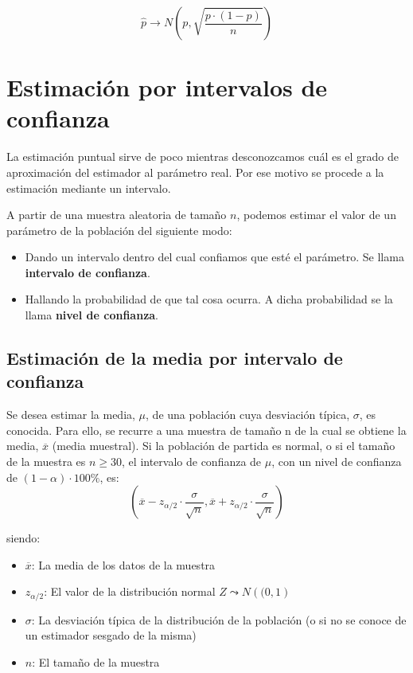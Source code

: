 $$\widehat{p} \rightarrow N \left ( p , \sqrt{ \frac{p \cdot (1-p)} {n}}\right )$$

\section{Estimación por intervalos de confianza}

La estimación puntual sirve de poco mientras
desconozcamos cuál es el grado de aproximación del estimador al parámetro real. Por ese motivo se procede
a la estimación mediante un intervalo.

A partir de una muestra aleatoria de tamaño $n$, podemos estimar el valor de un parámetro de la población del siguiente modo:
 
\begin{itemize}
\item Dando un intervalo dentro del cual confiamos que esté el parámetro. Se llama \textbf{intervalo de confianza}.
\item Hallando la probabilidad de que tal cosa ocurra. A dicha probabilidad se la llama \textbf{nivel de confianza}.
\end{itemize}


\subsection{Estimación de la media por intervalo de confianza} Se desea estimar la media, $\mu$, de una población cuya desviación típica, $\sigma$, es
conocida.
Para ello, se recurre a una muestra de tamaño n de la cual se obtiene la media,
$\overline{x}$ (media muestral).
Si la población de partida es normal, o si el tamaño de la muestra es $n \geqslant 30 $, el intervalo de confianza de $\mu$, con un nivel de confianza de $\left( 1 - \alpha \right)\cdot 100 \% $, es: $$ \left( \overline{x} - z_{\alpha / 2}\cdot \frac{\sigma}{\sqrt{n}} ,  \overline{x} + z_{\alpha / 2}\cdot \frac{\sigma}{\sqrt{n}}
\right)$$

siendo: \begin{itemize}
\item $\overline{x}$: La media de los datos de la muestra
\item $z_{\alpha / 2}$: El valor de la distribución normal $Z\leadsto N\left((0,1\right)$
\item $\sigma$: La desviación típica de la distribución de la población (o si no se conoce de un estimador sesgado de la misma)
\item $n$: El tamaño de la muestra
\end{itemize}

